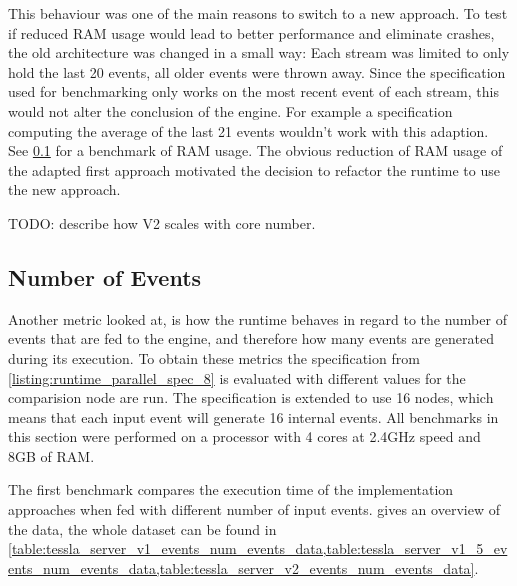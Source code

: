 This behaviour was one of the main reasons to switch to a new approach.
To test if reduced RAM usage would lead to better performance and eliminate crashes, the old architecture was changed in a small way: Each stream was limited to only hold the last 20 events, all older events were thrown away.
Since the specification used for benchmarking only works on the most recent event of each stream, this would not alter the conclusion of the engine.
For example a specification computing the average of the last 21 events wouldn't work with this adaption.
See \cref{sec:evaluation:runtime_benchmarks:num_events} for a benchmark of RAM usage.
The obvious reduction of RAM usage of the adapted first approach motivated the decision to refactor the runtime to use the new approach.

TODO: describe how V2 scales with core number.

\subsection{Number of Events}
\label{sec:evaluation:runtime_benchmarks:num_events}

Another metric looked at, is how the runtime behaves in regard to the number of events that are fed to the engine, and therefore how many events are generated during its execution.
To obtain these metrics the specification from \cref{listing:runtime_parallel_spec_8} is evaluated with different values for the comparision node are run.
The specification is extended to use 16 nodes, which means that each input event will generate 16 internal events.
All benchmarks in this section were performed on a processor with 4 cores at 2.4GHz speed and 8GB of RAM.

The first benchmark compares the execution time of the implementation approaches when fed with different number of input events.
 gives an overview of the data, the whole dataset can be found in \cref{table:tessla_server_v1_events_num_events_data,table:tessla_server_v1_5_events_num_events_data,table:tessla_server_v2_events_num_events_data}.

